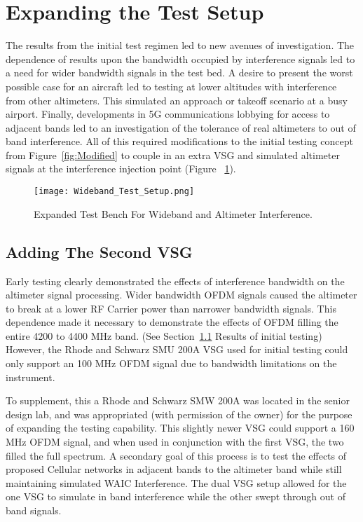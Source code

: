 \section{Expanding the Test Setup}
The results from the initial test regimen led to new avenues of investigation. The dependence of results upon the bandwidth occupied by interference signals led to a need for wider bandwidth signals in the test bed. A desire to present the worst possible case for an aircraft led to testing at lower altitudes with interference from other altimeters. This simulated an approach or takeoff scenario at a busy airport. Finally, developments in 5G communications lobbying for access to adjacent bands led to an investigation of the tolerance of real altimeters to out of band interference. All of this required modifications to the initial testing concept from Figure~\ref{fig:Modified} to couple in an extra VSG and simulated altimeter signals at the interference injection point (Figure ~\ref{fig:Wideband}).
\begin{figure}[ht]
\centering

\texttt{[image: Wideband\_Test\_Setup.png]}
\caption[]{Expanded Test Bench For Wideband and Altimeter Interference.}

\label{fig:Wideband}

\end{figure}
\subsection{Adding The Second VSG}
Early testing clearly demonstrated the effects of interference bandwidth on the altimeter signal processing. Wider bandwidth OFDM signals caused the altimeter to break at a lower RF Carrier power than narrower bandwidth signals. This dependence made it necessary to demonstrate the effects of OFDM filling the entire 4200 to 4400 MHz band. (See Section~\ref{} Results of initial testing) However, the Rhode and Schwarz SMU 200A VSG used for initial testing could only support an 100 MHz OFDM signal due to bandwidth limitations on the instrument.  

To supplement, this a Rhode and Schwarz SMW 200A was located in the senior design lab, and was appropriated (with permission of the owner) for the purpose of expanding the testing capability. This slightly newer VSG could support a 160 MHz OFDM signal, and when used in conjunction with the first VSG, the two filled the full spectrum. A secondary goal of this process is to test the effects of proposed Cellular networks in adjacent bands to the altimeter band while still maintaining simulated WAIC Interference. The dual VSG setup allowed for the one VSG to simulate in band interference while the other swept through out of band signals. 

